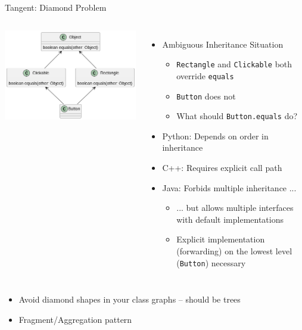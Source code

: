 \begin{frame}[fragile]{Tangent: Diamond Problem}
%
\begin{columns}
\includegraphics[width=\linewidth]{./gfx/16-uml-diamond_problem}
%
\begin{itemize}
\item Ambiguous Inheritance Situation
	\begin{itemize}
	\item \texttt{Rectangle} and \texttt{Clickable} both override \texttt{equals}
	\item \texttt{Button} does not
	\item[\Thus] What should \texttt{Button.equals} do?
	\end{itemize}
	\pause
\item Python: Depends on order in inheritance
\item C++: Requires explicit call path
\item Java: Forbids multiple inheritance ...
	\begin{itemize}
	\item ... but allows multiple interfaces with default implementations
	\item Explicit implementation (forwarding) on the lowest level (\texttt{Button}) necessary
	\end{itemize}
\end{itemize}
\end{columns}
\pause
%
\vspace{3pt}
\begin{itemize}
\item[\Thus] Avoid diamond shapes in your class graphs -- should be trees
\item[\Thus] Fragment/Aggregation pattern
\end{itemize}
%
\end{frame}

